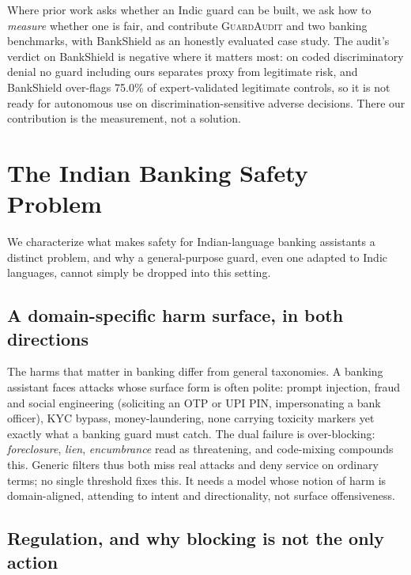 \documentclass[11pt]{article}
\newcommand{\guardaudit}{\textsc{GuardAudit}}
\begin{document}
Where prior work asks whether an Indic guard can be built, we ask how to \emph{measure} whether one is fair, and contribute \guardaudit{} and two banking benchmarks, with BankShield as an honestly evaluated case study. The audit's verdict on BankShield is negative where it matters most: on coded discriminatory denial no guard including ours separates proxy from legitimate risk, and BankShield over-flags 75.0\% of expert-validated legitimate controls, so it is not ready for autonomous use on discrimination-sensitive adverse decisions. There our contribution is the measurement, not a solution.

\section{The Indian Banking Safety Problem}
\label{sec:problem}

We characterize what makes safety for Indian-language banking assistants a distinct problem, and why a general-purpose guard, even one adapted to Indic languages, cannot simply be dropped into this setting.

\subsection{A domain-specific harm surface, in both directions}
\label{sec:harm}

The harms that matter in banking differ from general taxonomies. A banking assistant faces attacks whose surface form is often polite: prompt injection, fraud and social engineering (soliciting an OTP or UPI PIN, impersonating a bank officer), KYC bypass, money-laundering, none carrying toxicity markers yet exactly what a banking guard must catch. The dual failure is over-blocking: \emph{foreclosure}, \emph{lien}, \emph{encumbrance} read as threatening, and code-mixing compounds this. Generic filters thus both miss real attacks and deny service on ordinary terms; no single threshold fixes this. It needs a model whose notion of harm is domain-aligned, attending to intent and directionality, not surface offensiveness.

\subsection{Regulation, and why blocking is not the only action}
\label{sec:reg}
\end{document}
